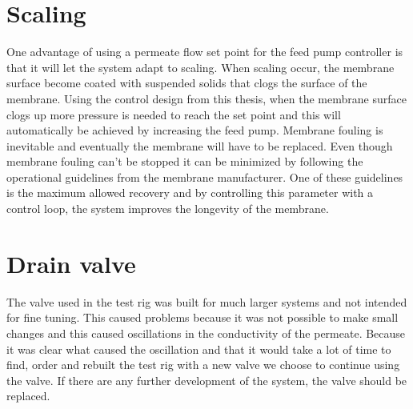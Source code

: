 \section{Scaling}
One advantage of using a permeate flow set point for the feed pump controller is that it will let the system adapt to scaling. When scaling occur, the membrane surface become coated with suspended solids that clogs the surface of the membrane. Using the control design from this thesis, when the membrane surface clogs up more pressure is needed to reach the set point and this will automatically be achieved by increasing the feed pump. Membrane fouling is inevitable and eventually the membrane will have to be replaced. Even though membrane fouling can't be stopped it can be minimized by following the operational guidelines from the membrane manufacturer. One of these guidelines is the maximum allowed recovery and by controlling this parameter with a control loop, the system improves the longevity of the membrane. 

\section{Drain valve}
The valve used in the test rig was built for much larger systems and not intended for fine tuning. This caused problems because it was not possible to make small changes and this caused oscillations in the conductivity of the permeate. Because it was clear what caused the oscillation and that it would take a lot of time to find, order and rebuilt the test rig with a new valve we choose to continue using the valve. If there are any further development of the system, the valve should be replaced.\\
\\